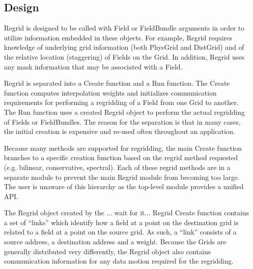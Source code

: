 
\subsection{Design}

Regrid is designed to be called with Field or FieldBundle
arguments in order to utilize information embedded in
these objects.  For example, Regrid requires knowledge
of underlying grid information (both PhysGrid and DistGrid)
and of the relative location (staggering) of Fields on
the Grid.  In addition, Regrid uses any mask information
that may be associated with a Field.

Regrid is separated into a Create function and a
Run function. The Create function computes
interpolation weights and initializes communication
requirements for performing a regridding of a Field
from one Grid to another.  The Run function uses
a created Regrid object to perform the actual regridding
of Fields or FieldBundles.  The reason for the separation
is that in many cases, the initial creation is
expensive and re-used often throughout an application.

Because many methods are supported for regridding,
the main Create function branches to a specific
creation function based on the regrid method requested
(e.g. bilinear, conservative, spectral).  Each of
these regrid methods are in a separate module to 
prevent the main Regrid module from becoming too
large.  The user is unaware of this hierarchy as the
top-level module provides a unified API.

The Regrid object created by the ... wait for it...
Regrid Create function contains a set of ``links''
which identify how a field at a point on the 
destination grid is related to a field at a 
point on the source grid.  As such, a ``link''
consists of a source address, a destination address
and a weight.  Because the Grids are generally
distributed very differently, the Regrid object
also contains communication information 
for any data motion required for the regridding.
 
